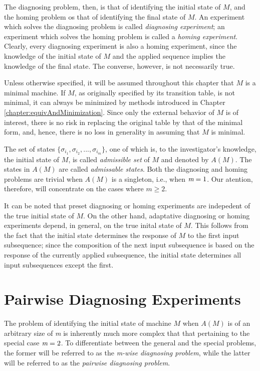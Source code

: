     The diagnosing problem, then, is that of identifying the initial state of $M$, and the homing problem os that of identifying the final state of $M$. An experiment which solves the diagnosing problem is called \emph{diagnosing experiment}; an experiment which solves the homing problem is called a \emph{homing experiment}. Clearly, every diagnosing experiment is also a homing experiment, since the knowledge of the initial state of $M$ and the applied sequence implies the knowledge of the final state. The converse, however, is not necessarily true.

    Unless otherwise specified, it will be assumed throughout this chapter that $M$ is a minimal machine. If $M$, as originally specified by its transition table, is not minimal, it can always be minimized by methods introduced in Chapter \ref{chapter:equivAndMinimization}. Since only the external behavior of $M$ is of interest, there is no risk in replacing the original table by that of the minimal form, and, hence, there is no loss in generality in assuming that $M$ is minimal.

    The set of states $\{ \sigma_{i_{1}}, \sigma_{i_{2}}, ..., \sigma_{i_{m}} \} $, one of which is, to the investigator's knowledge, the initial state of $M$, is called \emph{admissible set} of $M$ and denoted by $A(M)$. The states in $A(M)$ are called \emph{admissable states}. Both the diagnosing and homing problems are trivial when $A(M)$ is a singleton, i.e., when $\emph{m}=1$. Our atention, therefore, will concentrate on the cases where $m \geq 2$.

    It can be noted that preset diagnosing or homing experiments are indepedent of the true initial state of $M$. On the other hand, adaptative diagnosing or homing experiments depend, in general, on the true inital state of $M$. This follows from the fact that the initial state determines the response of $M$ to the first input subsequence; since the composition of the next input subsequence is based on the response of the currently applied subsequence, the initial state determines all input subsequences except the first.

\section{Pairwise Diagnosing Experiments}

    The problem of identifying the initial state of machine $M$ when $A(M)$ is of an arbitrary size of \emph{m} is inherently much more complex that that pertaining to the special case $ \emph{m} = 2 $. To differentiate between the general and the special problems, the former will be referred to as the \emph{m-wise diagnosing problem}, while the latter will be referred to as the \emph{pairwise diagnosing problem}.


